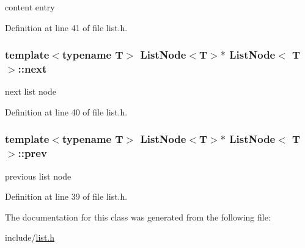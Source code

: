 content entry 



Definition at line 41 of file list.\-h.

\hypertarget{class_list_node_a97909c9598053ffd24b77ec715f745f1}{
\subsubsection[{next}]{\setlength{\rightskip}{0pt plus 5cm}template$<$typename T$>$ {\bf List\-Node}$<$T$>$$\ast$ {\bf List\-Node}$<$ T $>$\-::next\hspace{0.3cm}{\ttfamily [private]}}}\label{class_list_node_a97909c9598053ffd24b77ec715f745f1}


next list node 



Definition at line 40 of file list.\-h.

\hypertarget{class_list_node_a997ca532d810ebd030726ff880ba76b5}{
\subsubsection[{prev}]{\setlength{\rightskip}{0pt plus 5cm}template$<$typename T$>$ {\bf List\-Node}$<$T$>$$\ast$ {\bf List\-Node}$<$ T $>$\-::prev\hspace{0.3cm}{\ttfamily [private]}}}\label{class_list_node_a997ca532d810ebd030726ff880ba76b5}


previous list node 



Definition at line 39 of file list.\-h.



The documentation for this class was generated from the following file\-:\begin{DoxyCompactItemize}
\item 
include/\hyperlink{list_8h}{list.\-h}\end{DoxyCompactItemize}
